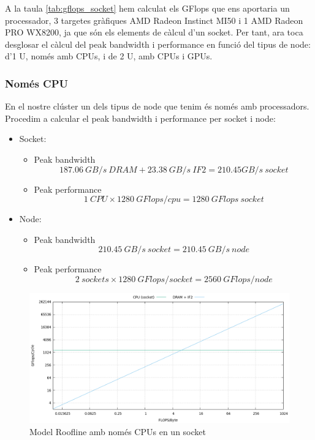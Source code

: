 A la taula \ref{tab:gflops_socket} hem calculat els GFlops que ens aportaria un processador, 3 targetes gràfiques AMD Radeon Instinct MI50 i 1 AMD Radeon PRO WX8200, ja que són els elements de càlcul d'un socket. Per tant, ara toca desglosar el càlcul del peak bandwidth i performance en funció del tipus de node: d'1 U, només amb CPUs, i de 2 U, amb CPUs i GPUs.

\subsubsection{Només CPU}
En el nostre clúster un dels tipus de node que tenim és només amb processadors. Procedim a calcular el peak bandwidth i performance per socket i node:

\begin{itemize}
    \item Socket:
        \begin{itemize}
            \item Peak bandwidth
                \[187.06\ GB/s\ DRAM + 23.38\ GB/s\ IF2 = 210.45 GB/s\ socket\]
            \item Peak performance
        \[ 1\ CPU \times 1280\ GFlops/cpu = 1280\ GFlops\ socket\]
        \end{itemize}
    \item Node:
        \begin{itemize}
            \item Peak bandwidth
                \[210.45\ GB/s\ socket = 210.45\ GB/s\ node\]
            \item Peak performance
\[2\ sockets \times 1280\ GFlops/socket = 2560\ GFlops/node\]
        \end{itemize}
\end{itemize}

\begin{figure}[H]
    \centering
    \includegraphics[width=\textwidth]{img/roofline_cpus_dram}
    \caption{Model Roofline amb només CPUs en un socket}
    \label{fig:summary}
\end{figure}


